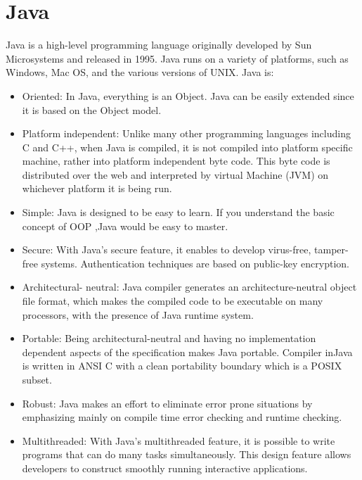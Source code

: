 \documentclass{SureshLimkar}
\begin{document}
\section{Java}
\hspace{0.5 in}Java is a high-level programming language originally developed by Sun Microsystems and released in 1995. Java runs on a variety of platforms, such as Windows, Mac OS, and the various versions of UNIX.
Java is: 
\begin{itemize}
 \item  Oriented: In Java, everything is an Object. Java can be easily extended since it is based on the Object model. 
\item Platform independent: Unlike many other programming languages including C and C++, when Java is compiled, it is not compiled into platform specific machine, rather into platform independent byte code. This byte code is distributed over the web and interpreted by virtual Machine (JVM) on whichever platform it is being run. 
\item Simple: Java is designed to be easy to learn. If you understand the basic concept of OOP ,Java would be easy to master. 
\item Secure: With Java's secure feature, it enables to develop virus-free, tamper-free systems. Authentication techniques are based on public-key encryption. 
\item Architectural- neutral: Java compiler generates an architecture-neutral object file format, which makes the compiled code to be executable on many processors, with the presence of Java runtime system. 
\item Portable: Being architectural-neutral and having no implementation dependent aspects of the specification makes Java portable. Compiler inJava is written in ANSI C with a clean portability boundary which is a POSIX subset. 
\item Robust: Java makes an effort to eliminate error prone situations by emphasizing mainly on compile time error checking and runtime checking. 
\item Multithreaded: With Java's multithreaded feature, it is possible to write programs that can do many tasks simultaneously. This design feature allows developers to construct smoothly running interactive applications. 
\end{itemize}
\end{document}
